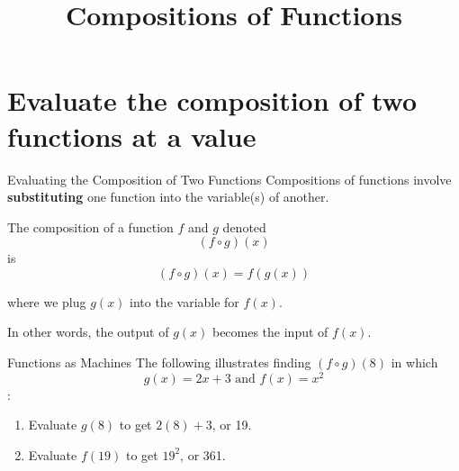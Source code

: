 \documentclass[t]{beamer}
\title{Compositions of Functions}
\author{}
\date{}
\begin{document}
\section{Evaluate the composition of two functions at a value}

\begin{frame}{Evaluating the Composition of Two Functions}
Compositions of functions involve {\color{blue}\textbf{substituting}} one function into the variable(s) of another.	\newline\\	\pause

The composition of a function $f$ and $g$ denoted
\[ (f \circ g)(x) \]
is
\[(f \circ g)(x) = f(g(x)) \]

where we plug $g(x)$ into the variable for $f(x)$.	\newline\\	\pause

In other words, the output of $g(x)$ becomes the input of $f(x)$.
\end{frame}

\begin{frame}{Functions as Machines}
The following illustrates finding $(f \circ g)(8)$ in which \[g(x)=2x+3 \text{ and } f(x) = x^2\]:		\pause

\begin{center}
\end{center}	\pause
\begin{enumerate}
\item<+-> Evaluate $g(8)$ to get $2(8)+3$, or 19. \newline\\
\item<+-> Evaluate $f(19)$ to get $19^2$, or 361.
\end{enumerate}
\end{frame}
\end{document}
